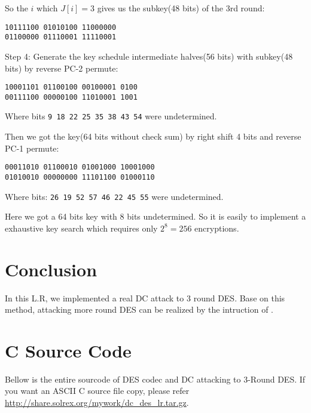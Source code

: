 \documentclass[a4paper,10pt]{article}
\begin{document}
So the $i$ which $J[i] = 3$ gives us the subkey(48 bits) of the 3rd round:
\begin{center}
\texttt{10111100 01010100 11000000}\\
\texttt{01100000 01110001 11110001}
\end{center}

\noindent\textsf{Step 4:} Generate the key schedule intermediate halves(56 bits) with subkey(48 bits) by reverse PC-2 permute\cite{DES}:
\begin{center}
\texttt{10001101 01100100 00100001 0100}\\
\texttt{00111100 00000100 11010001 1001}
\end{center}
Where bits \texttt{9 18 22 25 35 38 43 54} were undetermined.

Then we got the key(64 bits without check sum) by right shift 4 bits and reverse PC-1 permute\cite{DES}:
\begin{center}
\texttt{00011010 01100010 01001000 10001000}\\
\texttt{01010010 00000000 11101100 01000110}
\end{center}
Where bits: \texttt{26 19 52 57 46 22 45 55} were undetermined.

Here we got a 64 bits key with 8 bits undetermined. So it is easily to implement a exhaustive key search which requires only $2^8=256$ encryptions.

\section{Conclusion}

In this L.R, we implemented a real DC attack to 3 round DES. Base on this method, attacking more round DES can be realized by the intruction of \cite{BIHA91}.

\section{C Source Code}

Bellow is the entire sourcode of DES codec and DC attacking to 3-Round DES. If you want an ASCII C source file copy, please refer \url{http://share.solrex.org/mywork/dc_des_lr.tar.gz}.

\end{document}
